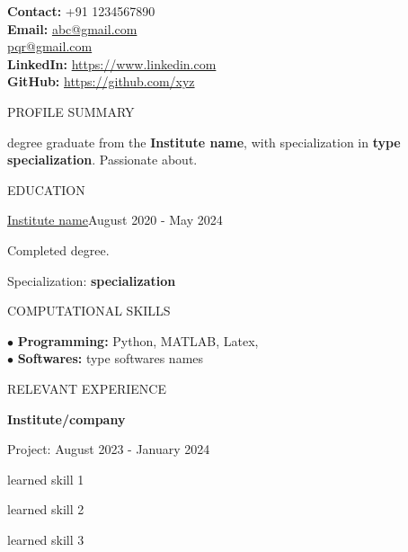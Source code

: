 \documentclass{resume}
\begin{document}
	
	\textbf{Contact:} +91 1234567890 \\  
	\textbf{Email:} \href{mail to : abc@gmail.com}{abc@gmail.com} \\ 
	\href {mail to : pqr@gmail.com}{\hspace{40pt}pqr@gmail.com} \\ 
	\textbf{LinkedIn:} \href{https://www.linkedin.com}{https://www.linkedin.com}\\ 
	\textbf{GitHub:} \href{https://github.com/xyz}{https://github.com/xyz}
	
	\vspace*{0.5cm}
	\begin{rSection}{PROFILE SUMMARY}
		
		{degree graduate from the \textbf{ Institute name},
			with specialization in \textbf{type specialization}. 
			Passionate about.}
		
	\end{rSection}
	
	
	
	\begin{rSection}{EDUCATION}
		
		\begin{rSubsection}{\href{institute website link/}{\underline{Institute name}}}{August 2020 - May 2024}{}{} 
			\item Completed degree.
			\item Specialization: \textbf{specialization}
		\end{rSubsection} 
		
	\end{rSection} 
	
	
	
	\begin{rSection}{COMPUTATIONAL SKILLS}
		
		$\bullet$ \textbf{Programming:} Python, MATLAB, Latex,  \\
		$\bullet$ \textbf{Softwares:} type softwares names
	
	\end{rSection}
	
	
	\begin{rSection}{RELEVANT EXPERIENCE}
		
		
		\textbf{\Large{ Institute/company}}
		
		\begin{rSubsection}{\hspace{0.3cm}Project: }{August 2023 - January 2024}{}{}
			\item learned skill 1
			\item learned skill 2
			\item learned skill 3
		\end{rSubsection} 
		
	\end{rSection}
	
\end{document}
